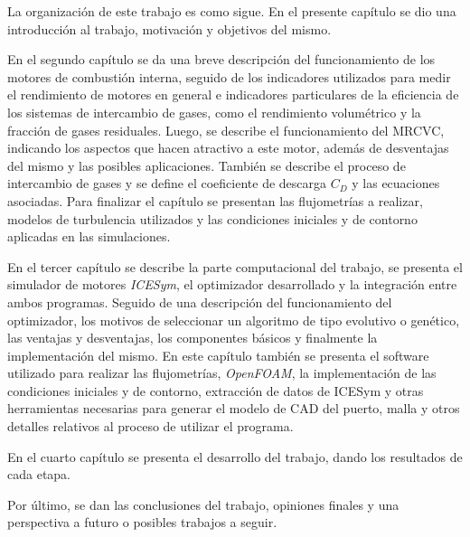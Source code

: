 La organización de este trabajo es como sigue.
%
En el presente capítulo se dio una introducción al trabajo, motivación y
objetivos del mismo.

En el segundo capítulo se da una breve descripción del funcionamiento de los
motores de combustión interna, seguido de los indicadores utilizados para medir
el rendimiento de motores en general e indicadores particulares de la
eficiencia de los sistemas de intercambio de gases, como el rendimiento
volumétrico y la fracción de gases residuales.
%
Luego, se describe el funcionamiento del MRCVC, indicando los aspectos que
hacen atractivo a este motor, además de desventajas del mismo y las posibles
aplicaciones.
%
También se describe el proceso de intercambio de gases y se define el
coeficiente de descarga $C_D$ y las ecuaciones asociadas.
%
Para finalizar el capítulo se presentan las flujometrías a realizar, modelos de
turbulencia utilizados y las condiciones iniciales y de contorno aplicadas en
las simulaciones.
%

En el tercer capítulo se describe la parte computacional del trabajo, se
presenta el simulador de motores \emph{ICESym}, el optimizador desarrollado y la
integración entre ambos programas.
%
Seguido de una descripción del funcionamiento del optimizador, los motivos de
seleccionar un algoritmo de tipo evolutivo o genético, las ventajas y
desventajas, los componentes básicos y finalmente la implementación del mismo.
%
En este capítulo también se presenta el software utilizado para realizar las
flujometrías, \emph{OpenFOAM}, la implementación de las condiciones iniciales y
de contorno, extracción de datos de ICESym y otras herramientas necesarias para
generar el modelo de CAD del puerto, malla y otros detalles relativos al proceso
de utilizar el programa.

En el cuarto capítulo se presenta el desarrollo del trabajo, dando los resultados
de cada etapa.

Por último, se dan las conclusiones del trabajo, opiniones finales y una
perspectiva a futuro o posibles trabajos a seguir.
